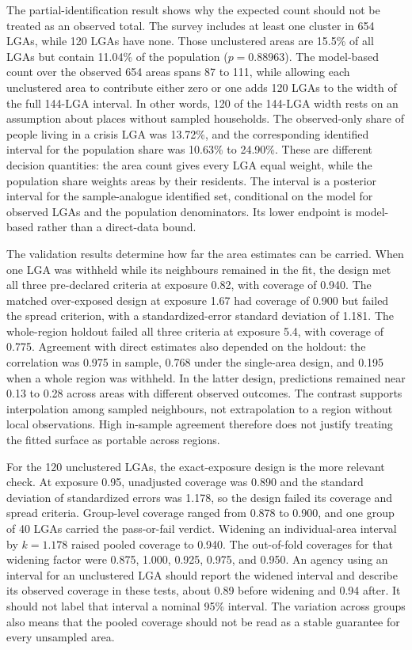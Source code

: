 The partial-identification result shows why the expected count should not be treated as an observed total. The survey includes at least one cluster in 654 LGAs, while 120 LGAs have none. Those unclustered areas are 15.5\% of all LGAs but contain 11.04\% of the population (\(p=0.88963\)). The model-based count over the observed 654 areas spans 87 to 111, while allowing each unclustered area to contribute either zero or one adds 120 LGAs to the width of the full 144-LGA interval. In other words, 120 of the 144-LGA width rests on an assumption about places without sampled households. The observed-only share of people living in a crisis LGA was 13.72\%, and the corresponding identified interval for the population share was 10.63\% to 24.90\%. These are different decision quantities: the area count gives every LGA equal weight, while the population share weights areas by their residents. The interval is a posterior interval for the sample-analogue identified set, conditional on the model for observed LGAs and the population denominators. Its lower endpoint is model-based rather than a direct-data bound.

The validation results determine how far the area estimates can be carried. When one LGA was withheld while its neighbours remained in the fit, the design met all three pre-declared criteria at exposure 0.82, with coverage of 0.940. The matched over-exposed design at exposure 1.67 had coverage of 0.900 but failed the spread criterion, with a standardized-error standard deviation of 1.181. The whole-region holdout failed all three criteria at exposure 5.4, with coverage of 0.775. Agreement with direct estimates also depended on the holdout: the correlation was 0.975 in sample, 0.768 under the single-area design, and 0.195 when a whole region was withheld. In the latter design, predictions remained near 0.13 to 0.28 across areas with different observed outcomes. The contrast supports interpolation among sampled neighbours, not extrapolation to a region without local observations. High in-sample agreement therefore does not justify treating the fitted surface as portable across regions.

For the 120 unclustered LGAs, the exact-exposure design is the more relevant check. At exposure 0.95, unadjusted coverage was 0.890 and the standard deviation of standardized errors was 1.178, so the design failed its coverage and spread criteria. Group-level coverage ranged from 0.878 to 0.900, and one group of 40 LGAs carried the pass-or-fail verdict. Widening an individual-area interval by \(k=1.178\) raised pooled coverage to 0.940. The out-of-fold coverages for that widening factor were 0.875, 1.000, 0.925, 0.975, and 0.950. An agency using an interval for an unclustered LGA should report the widened interval and describe its observed coverage in these tests, about 0.89 before widening and 0.94 after. It should not label that interval a nominal 95\% interval. The variation across groups also means that the pooled coverage should not be read as a stable guarantee for every unsampled area.

